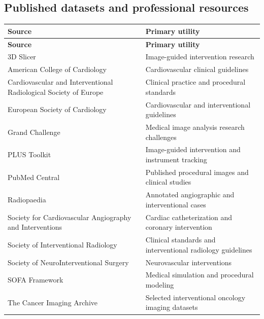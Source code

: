 \subsection{Published datasets and professional resources}
\begin{longtable}{@{}p{}p{}@{}}
\toprule
\textbf{Source} & \textbf{Primary utility} \\
\midrule
\endfirsthead
\toprule
\textbf{Source} & \textbf{Primary utility} \\
\midrule
\endhead
3D Slicer & Image-guided intervention research \\
American College of Cardiology & Cardiovascular clinical guidelines \\
Cardiovascular and Interventional Radiological Society of Europe & Clinical practice and procedural standards \\
European Society of Cardiology & Cardiovascular and interventional guidelines \\
Grand Challenge & Medical image analysis research challenges \\
PLUS Toolkit & Image-guided intervention and instrument tracking \\
PubMed Central & Published procedural images and clinical studies \\
Radiopaedia & Annotated angiographic and interventional cases \\
Society for Cardiovascular Angiography and Interventions & Cardiac catheterization and coronary intervention \\
Society of Interventional Radiology & Clinical standards and interventional radiology guidelines \\
Society of NeuroInterventional Surgery & Neurovascular interventions \\
SOFA Framework & Medical simulation and procedural modeling \\
The Cancer Imaging Archive & Selected interventional oncology imaging datasets \\
\bottomrule
\end{longtable}

